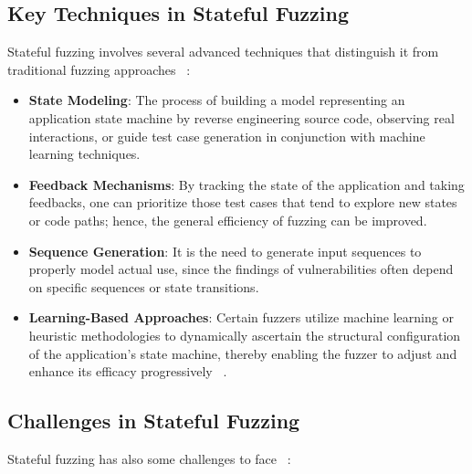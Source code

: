 \subsection{Key Techniques in Stateful Fuzzing}
Stateful fuzzing involves several advanced techniques that distinguish it from traditional fuzzing approaches ~\cite{statefulfuzzingcristian}:

\begin{itemize}
    \item \textbf{State Modeling}: The process of building a model representing an application state machine by reverse engineering source code, observing real interactions, or guide test case generation in conjunction with machine learning techniques.
    
    \item \textbf{Feedback Mechanisms}: By tracking the state of the application and taking feedbacks, one can prioritize those test cases that tend to explore new states or code paths; hence, the general efficiency of fuzzing can be improved.
    
    \item \textbf{Sequence Generation}: It is the need to generate input sequences to properly model actual use, since the findings of vulnerabilities often depend on specific sequences or state transitions.
    
    \item \textbf{Learning-Based Approaches}: Certain fuzzers utilize machine learning or heuristic methodologies to dynamically ascertain the structural configuration of the application's state machine, thereby enabling the fuzzer to adjust and enhance its efficacy progressively ~\cite{learningbasedfuzzing,learningbasedfuzzing2}.
\end{itemize}

\subsection{Challenges in Stateful Fuzzing}
Stateful fuzzing has also some challenges to face ~\cite{statefulfuzzingchallenges}:

